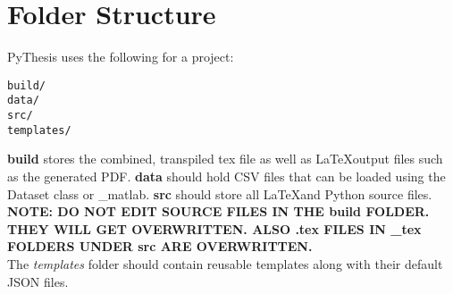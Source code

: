 \section{Folder Structure}
\label{sec:folder-structure}
PyThesis uses the following for a project:
\begin{verbatim}
build/ 
data/
src/
templates/
\end{verbatim}
\textbf{build} stores the combined, transpiled tex file as well as \LaTeX output files such as the generated PDF. \textbf{data} should hold CSV files that can be loaded using the Dataset class or \_matlab. \textbf{src} should store all \LaTeX and Python source files. \\

\textbf{NOTE: DO NOT EDIT SOURCE FILES IN THE build FOLDER. THEY WILL GET OVERWRITTEN. ALSO .tex FILES IN \_tex FOLDERS UNDER src ARE OVERWRITTEN.} \\

The \emph{templates} folder should contain reusable templates along with their default JSON files.
